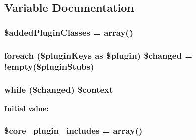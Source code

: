 \subsection{Variable Documentation}
\hypertarget{plugins_8php_ac7efc2293a590953b6c6640eaf342787}{
\subsubsection[{\$added\-Plugin\-Classes}]{\setlength{\rightskip}{0pt plus 5cm}\$added\-Plugin\-Classes = array()}}\label{plugins_8php_ac7efc2293a590953b6c6640eaf342787}
\hypertarget{plugins_8php_a843689f8628a0cc2a361697895b56ff2}{
\subsubsection[{\$changed}]{\setlength{\rightskip}{0pt plus 5cm}foreach (\$plugin\-Keys as \$plugin) \$changed = !empty(\$plugin\-Stubs)}}\label{plugins_8php_a843689f8628a0cc2a361697895b56ff2}
\hypertarget{plugins_8php_a4440f2a80a414d71dc20fa13b53ca1b8}{
\subsubsection[{\$context}]{\setlength{\rightskip}{0pt plus 5cm}while (\$changed) \$context}}\label{plugins_8php_a4440f2a80a414d71dc20fa13b53ca1b8}
{\bfseries Initial value\-:}
\hypertarget{plugins_8php_aaf1557085743461047339e32fe24037f}{
\subsubsection[{\$core\-\_\-plugin\-\_\-includes}]{\setlength{\rightskip}{0pt plus 5cm}\$core\-\_\-plugin\-\_\-includes = array()}}\label{plugins_8php_aaf1557085743461047339e32fe24037f}

